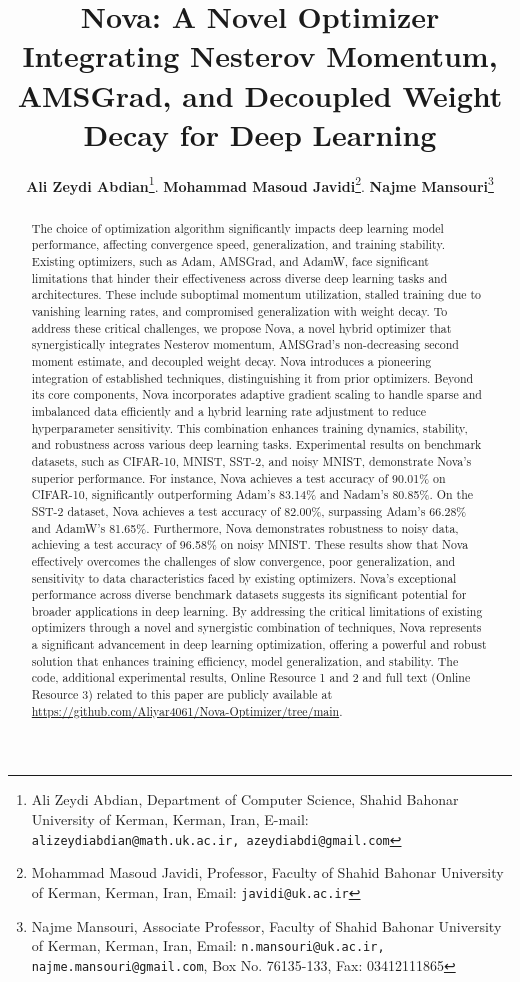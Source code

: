 \documentclass[10pt,twocolumn]{article}
\date{}
\title{\bf{Nova: A Novel Optimizer Integrating Nesterov Momentum, AMSGrad, and Decoupled Weight Decay for Deep Learning
}}
\author{
 \begin{tabular}{rl}
  {\bf Ali Zeydi Abdian}\thanks{Ali Zeydi Abdian, Department of Computer Science, Shahid Bahonar University of Kerman, Kerman, Iran,   E-mail: \texttt{alizeydiabdian@math.uk.ac.ir, azeydiabdi@gmail.com}}.  {\bf Mohammad Masoud Javidi}\thanks{Mohammad Masoud Javidi, Professor, Faculty of Shahid Bahonar University of Kerman, Kerman, Iran,  Email: \texttt{javidi@uk.ac.ir}}.  {\bf Najme Mansouri}\thanks{Najme Mansouri, Associate Professor, Faculty of Shahid Bahonar University of Kerman, Kerman, Iran, Email: \texttt{n.mansouri@uk.ac.ir, najme.mansouri@gmail.com}, Box No. 76135-133, Fax: 03412111865}
\end{tabular}
}
\begin{document}
\maketitle




\begin{abstract}
The choice of optimization algorithm significantly impacts deep learning model performance, affecting convergence speed, generalization, and training stability. Existing optimizers, such as Adam, AMSGrad, and AdamW, face significant limitations that hinder their effectiveness across diverse deep learning tasks and architectures. These include suboptimal momentum utilization, stalled training due to vanishing learning rates, and compromised generalization with weight decay. To address these critical challenges, we propose Nova, a novel hybrid optimizer that synergistically integrates Nesterov momentum, AMSGrad’s non-decreasing second moment estimate, and decoupled weight decay. Nova introduces a pioneering integration of established techniques, distinguishing it from prior optimizers. Beyond its core components, Nova incorporates adaptive gradient scaling to handle sparse and imbalanced data efficiently and a hybrid learning rate adjustment to reduce hyperparameter sensitivity. This combination enhances training dynamics, stability, and robustness across various deep learning tasks. Experimental results on benchmark datasets, such as CIFAR-10, MNIST, SST-2, and noisy MNIST, demonstrate Nova’s superior performance. For instance, Nova achieves a test accuracy of 90.01\% on CIFAR-10, significantly outperforming Adam’s 83.14\% and Nadam’s 80.85\%. On the SST-2 dataset, Nova achieves a test accuracy of 82.00\%, surpassing Adam's 66.28\% and AdamW's 81.65\%. Furthermore, Nova demonstrates robustness to noisy data, achieving a test accuracy of 96.58\% on noisy MNIST. These results show that Nova effectively overcomes the challenges of slow convergence, poor generalization, and sensitivity to data characteristics faced by existing optimizers. Nova’s exceptional performance across diverse benchmark datasets suggests its significant potential for broader applications in deep learning. By addressing the critical limitations of existing optimizers through a novel and synergistic combination of techniques, Nova represents a significant advancement in deep learning optimization, offering a powerful and robust solution that enhances training efficiency, model generalization, and stability. The code, additional experimental results, Online Resource 1 and 2 and full text (Online Resource 3)   related to this paper are publicly available at \url{https://github.com/Aliyar4061/Nova-Optimizer/tree/main}.\\


\end{abstract}
\end{document}
